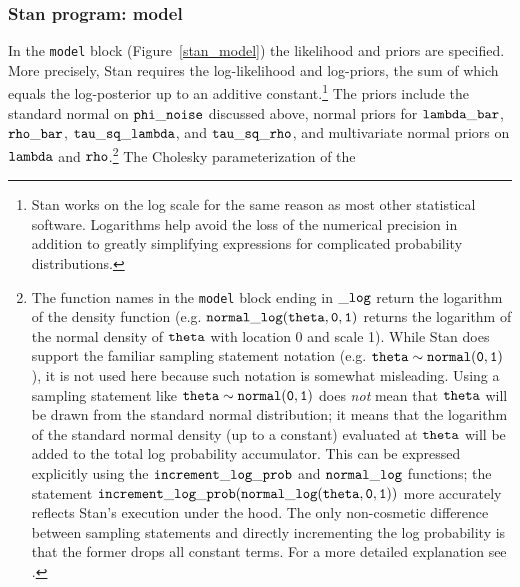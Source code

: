 \subsubsection{Stan program: model}

In the {\tt model} block (Figure~\ref{stan_model}) the likelihood and priors are specified. More 
precisely, Stan requires the log-likelihood and log-priors, the sum of which equals the log-posterior 
up to an additive constant.\footnote{Stan works on the log scale for the same reason as most 
other statistical software. Logarithms help avoid the loss of the numerical precision in addition to 
greatly simplifying expressions for complicated probability distributions.}
The priors include the standard normal on ${\tt phi\_noise}$ discussed above, normal priors for 
${\tt lambda\_bar}$, ${\tt rho\_bar}$, ${\tt tau\_sq\_lambda}$, and ${\tt tau\_sq\_rho}$, and multivariate 
normal priors on ${\tt lambda}$ and ${\tt rho}$.\footnote{The function names in the {\tt model} block 
ending in ${\tt\_log}$ return the logarithm of the density function (e.g. ${\tt normal\_log(theta,0,1)}$ 
returns the logarithm of the normal density of ${\tt theta}$  with location 0 and scale 1). While Stan 
does support the familiar sampling statement notation (e.g. ${\tt theta \sim normal(0,1)}$), it is not 
used here because such notation is somewhat misleading. Using a sampling statement like 
${\tt theta \sim normal(0,1)}$ does {\it not} mean that ${\tt theta}$ will be drawn from the standard 
normal distribution; it means that the logarithm of the standard normal density (up to a constant) 
evaluated at ${\tt theta}$ will be added to the total log probability accumulator. This can be expressed 
explicitly using the ${\tt increment\_log\_prob}$ and ${\tt normal\_log}$ functions; the statement 
${\tt increment\_log\_prob(normal\_log(theta,0,1))}$ more accurately reflects Stan's execution 
under the hood. The only non-cosmetic difference between sampling statements and directly 
incrementing the log probability is that the former drops all constant terms. For a more detailed 
explanation see .} The Cholesky parameterization of the 
